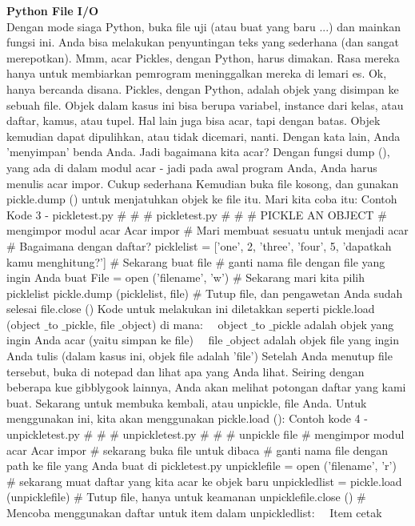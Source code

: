 \begin{center}{\fontsize{24pt}{24pt}\selectfont \textbf{Python File I/O} \\}
Dengan mode siaga Python, buka file uji (atau buat yang baru ...) dan mainkan fungsi ini. Anda bisa melakukan penyuntingan teks yang sederhana (dan sangat merepotkan). 
Mmm, acar 
Pickles, dengan Python, harus dimakan. Rasa mereka hanya untuk membiarkan pemrogram meninggalkan mereka di lemari es. 
Ok, hanya bercanda disana. Pickles, dengan Python, adalah objek yang disimpan ke sebuah file. Objek dalam kasus ini bisa berupa variabel, instance dari kelas, atau daftar, kamus, atau tupel. Hal lain juga bisa acar, tapi dengan batas. Objek kemudian dapat dipulihkan, atau tidak dicemari, nanti. Dengan kata lain, Anda 'menyimpan' benda Anda. 
Jadi bagaimana kita acar? Dengan fungsi dump (), yang ada di dalam modul acar - jadi pada awal program Anda, Anda harus menulis acar impor. Cukup sederhana Kemudian buka file kosong, dan gunakan pickle.dump () untuk menjatuhkan objek ke file itu. Mari kita coba itu: 
Contoh Kode 3 - pickletest.py 
 $  \#  $ $  \#  $ $  \#  $ pickletest.py 
 $  \#  $ $  \#  $ $  \#  $ PICKLE AN OBJECT 
 $  \#  $ mengimpor modul acar 
Acar impor 
 $  \#  $ Mari membuat sesuatu untuk menjadi acar 
 $  \#  $ Bagaimana dengan daftar? 
picklelist = ['one', 2, 'three', 'four', 5, 'dapatkah kamu menghitung?']
 $  \#  $ Sekarang buat file
 $  \#  $ ganti nama file dengan file yang ingin Anda buat
File = open ('filename', 'w')
 $  \#  $ Sekarang mari kita pilih picklelist 
pickle.dump (picklelist, file) 
 $  \#  $ Tutup file, dan pengawetan Anda sudah selesai 
file.close ()
Kode untuk melakukan ini diletakkan seperti pickle.load (object $  \_  $to $  \_  $pickle, file $  \_  $object) di mana:
 $  $ $  $ $  $ $  $object $  \_  $to $  \_  $pickle adalah objek yang ingin Anda acar (yaitu simpan ke file) 
 $  $ $  $ $  $ $  $file $  \_  $object adalah objek file yang ingin Anda tulis (dalam kasus ini, objek file adalah 'file') 
Setelah Anda menutup file tersebut, buka di notepad dan lihat apa yang Anda lihat. Seiring dengan beberapa kue gibblygook lainnya, Anda akan melihat potongan daftar yang kami buat. 
Sekarang untuk membuka kembali, atau unpickle, file Anda. Untuk menggunakan ini, kita akan menggunakan pickle.load (): 
Contoh kode 4 - unpickletest.py
{\fontsize{10pt}{10pt}\selectfont  $  \#  $ $  \#  $ $  \#  $ unpickletest.py}
{\fontsize{10pt}{10pt}\selectfont  $  \#  $ $  \#  $ $  \#  $ unpickle file} 
{\fontsize{10pt}{10pt}\selectfont  $  \#  $ mengimpor modul acar} 
{\fontsize{10pt}{10pt}\selectfont Acar impor} 
{\fontsize{10pt}{10pt}\selectfont  $  \#  $ sekarang buka file untuk dibaca}
{\fontsize{10pt}{10pt}\selectfont  $  \#  $ ganti nama file dengan path ke file yang Anda buat di pickletest.py}
{\fontsize{10pt}{10pt}\selectfont unpicklefile = open ('filename', 'r')}
{\fontsize{10pt}{10pt}\selectfont  $  \#  $ sekarang muat daftar yang kita acar ke objek baru}
{\fontsize{10pt}{10pt}\selectfont unpickledlist = pickle.load (unpicklefile)} 
{\fontsize{10pt}{10pt}\selectfont  $  \#  $ Tutup file, hanya untuk keamanan} 
{\fontsize{10pt}{10pt}\selectfont unpicklefile.close ()} 
{\fontsize{10pt}{10pt}\selectfont  $  \#  $ Mencoba menggunakan daftar} 
{\fontsize{10pt}{10pt}\selectfont untuk item dalam unpickledlist:}
{\fontsize{10pt}{10pt}\selectfont  $  $ $  $ $  $ $  $Item cetak} 



\end{center}
